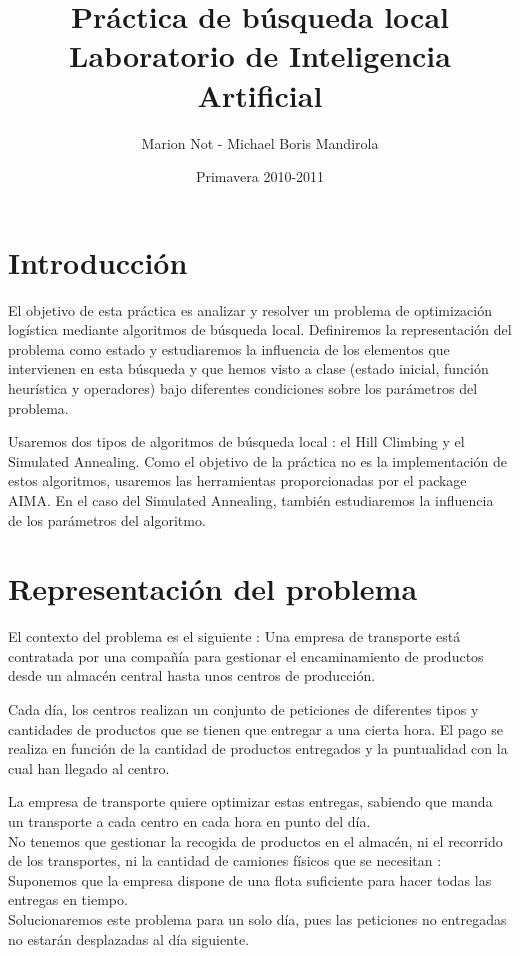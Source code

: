 \documentclass{article}
\title{\Huge{Práctica de búsqueda local} \\
\vspace{15mm}
   \Large{Laboratorio de Inteligencia Artificial}}
\author{Marion Not - Michael Boris Mandirola}
\date{Primavera 2010-2011}
\begin{document}
\maketitle
\newpage
\tableofcontents
\newpage
\section*{Introducción}
El objetivo de esta práctica es analizar y resolver un problema de optimización
logística mediante algoritmos de búsqueda local. Definiremos la representación
del problema como estado y estudiaremos la influencia de los elementos que
intervienen en esta búsqueda y que hemos visto a clase (estado inicial, función
heurística y operadores) bajo diferentes condiciones sobre los parámetros del
problema.

Usaremos dos tipos de algoritmos de búsqueda local : el Hill Climbing y el
Simulated Annealing. Como el objetivo de la práctica no es la implementación de
estos algoritmos, usaremos las herramientas proporcionadas por el package AIMA. 
En el caso del Simulated Annealing, también estudiaremos la influencia de los 
parámetros del algoritmo.

\section{Representación del problema}
El contexto del problema es el siguiente : Una empresa de transporte está
contratada por una compañía para gestionar el encaminamiento de productos desde
un almacén central hasta unos centros de producción.

Cada día, los centros realizan un conjunto de peticiones de diferentes tipos y 
cantidades de productos que se tienen que entregar a una cierta hora. El pago se
realiza en función de la cantidad de productos entregados y la puntualidad con
la cual han llegado al centro.

La empresa de transporte quiere optimizar estas entregas, sabiendo que manda un
transporte a cada centro en cada hora en punto del día.\\
No tenemos que gestionar la recogida de productos en el almacén, ni el recorrido
de los transportes, ni la cantidad de camiones físicos que se necesitan :
Suponemos que la empresa dispone de una flota suficiente para hacer todas las
entregas en tiempo.\\
Solucionaremos este problema para un solo día, pues las peticiones no entregadas
no estarán desplazadas al día siguiente.
\end{document}
